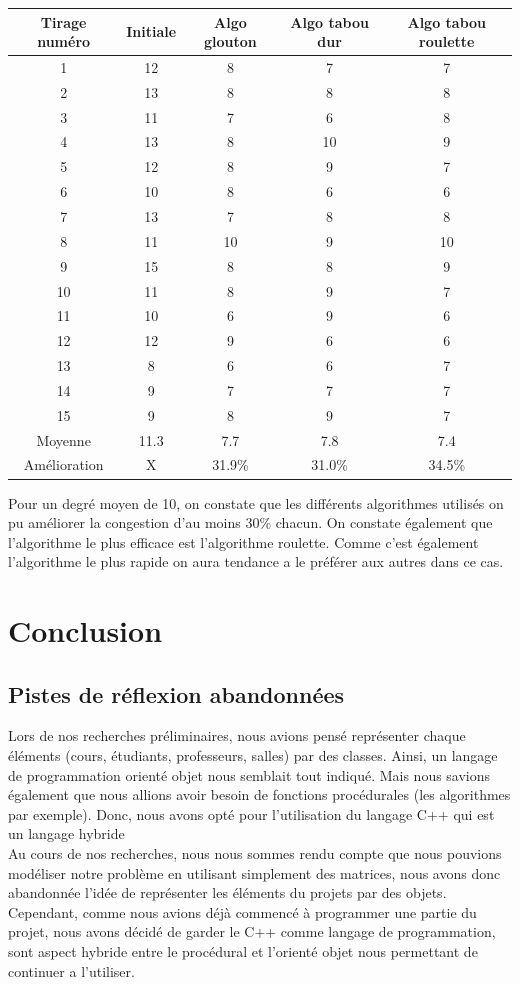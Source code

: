 \documentclass[a4paper,11pt]{article}
\begin{document}
	\begin{tabular}{|c|c|c|c|c|}
  		\hline
  		Tirage numéro & Initiale & Algo glouton & Algo tabou dur & Algo tabou roulette\\
  		\hline
  		1 & 12 & 8 & 7 & 7\\
  		\hline
  		2 & 13& 8& 8&8\\
  		\hline
  		3 & 11 & 7 & 6 & 8\\
  		\hline
  		4 & 13 & 8 & 10 & 9\\
  		\hline
  		5 & 12 & 8 & 9 & 7\\
  		\hline
  		6 & 10 & 8 & 6 & 6\\
  		\hline
  		7 & 13 & 7 & 8 & 8\\
  		\hline
  		8 & 11 & 10 & 9 & 10\\
  		\hline
  		9 & 15 & 8 & 8 & 9\\
  		\hline
  		10 & 11 & 8 & 9 & 7\\
  		\hline
  		11 & 10 & 6 & 9 & 6\\
  		\hline
  		12 & 12 & 9 & 6 & 6\\
  		\hline
  		13 & 8 & 6 & 6 & 7\\
  		\hline
  		14 & 9 & 7 & 7 & 7\\
  		\hline
  		15 & 9 & 8 & 9 & 7\\
  		\hline
  		Moyenne  &11.3  &7.7  &7.8 &  7.4\\
  		\hline
  		Amélioration & X & 31.9\% & 31.0\% & 34.5\%\\
  		\hline
	\end{tabular}
	Pour un degré moyen de 10, on constate que les différents algorithmes utilisés on pu améliorer la congestion d'au moins 30\% chacun. On constate également que l'algorithme le plus efficace est l'algorithme roulette. Comme c'est également l'algorithme le plus rapide on aura tendance a le préférer aux autres dans ce cas.
	
\section{Conclusion}
	\subsection{Pistes de réflexion abandonnées}
		Lors de nos recherches préliminaires, nous avions pensé représenter chaque éléments (cours, étudiants, professeurs, salles) par des classes. Ainsi, un langage de programmation orienté objet nous semblait tout indiqué. Mais nous savions également que nous allions avoir besoin de fonctions procédurales (les algorithmes par exemple). Donc, nous avons opté pour l'utilisation du langage C++ qui est un langage hybride\\
		Au cours de nos recherches, nous nous sommes rendu compte que nous pouvions modéliser notre problème en utilisant simplement des matrices, nous avons donc abandonnée l'idée de représenter les éléments du projets par des objets.\\
		Cependant, comme nous avions déjà commencé à programmer une partie du projet, nous avons décidé de garder le C++ comme langage de programmation, sont aspect hybride entre le procédural et l'orienté objet nous permettant de continuer a l'utiliser.
	
\end{document}

